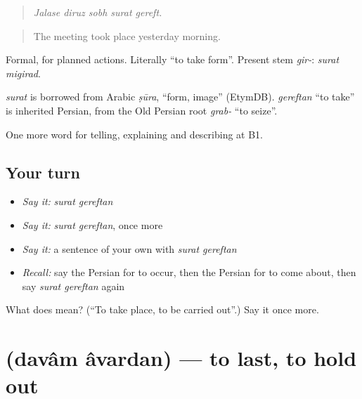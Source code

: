 \begin{quote}
\emph{Jalase diruz sobh surat gereft.}
\end{quote}

\begin{quote}
The meeting took place yesterday morning.
\end{quote}

Formal, for planned actions. Literally \textquotedblleft{}to take form\textquotedblright{}. Present stem \emph{gir-}: \emph{surat migirad}.

\begin{cousinweb}
\emph{surat} is borrowed from Arabic \emph{ṣūra}, \textquotedblleft{}form, image\textquotedblright{} (EtymDB). \emph{gereftan} \textquotedblleft{}to take\textquotedblright{} is inherited Persian, from the Old Persian root \emph{grab-} \textquotedblleft{}to seize\textquotedblright{}.
\end{cousinweb}

\begin{grammarlens}[title={What you've built}]
One more word for telling, explaining and describing at B1.
\end{grammarlens}

\subsection*{Your turn}
\begin{itemize}
\raggedright
  \item \emph{Say it:} \emph{surat gereftan}
  \item \emph{Say it:} \emph{surat gereftan}, once more
  \item \emph{Say it:} a sentence of your own with \emph{surat gereftan}
  \item \emph{Recall:} say the Persian for to occur, then the Persian for to come about, then say \emph{surat gereftan} again
\end{itemize}

\begin{tcolorbox}[breakable,colback=teal!4,colframe=teal!35!black,title={Before you move on}]
What does   mean? (\textquotedblleft{}To take place, to be carried out\textquotedblright{}.) Say it once more.
\end{tcolorbox}
\section[\texorpdfstring{\fa{دوام} \fa{آوردن} (davâm âvardan)}{دوام آوردن (davâm âvardan)}]{  (davâm âvardan) — to last, to hold out}

